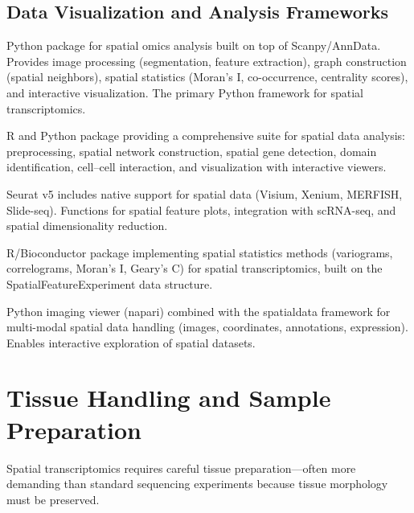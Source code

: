 \subsection{Data Visualization and Analysis Frameworks}

\begin{description}[style=nextline]
  \item[\software{Squidpy}] Python package for spatial omics analysis built on
    top of Scanpy/AnnData. Provides image processing (segmentation, feature
    extraction), graph construction (spatial neighbors), spatial statistics
    (Moran's I, co-occurrence, centrality scores), and interactive
    visualization. The primary Python framework for spatial transcriptomics.
  \item[\software{Giotto}] R and Python package providing a comprehensive suite
    for spatial data analysis: preprocessing, spatial network construction,
    spatial gene detection, domain identification, cell--cell interaction, and
    visualization with interactive viewers.
  \item[\software{Seurat} (spatial module)] Seurat v5 includes native support
    for spatial data (Visium, Xenium, MERFISH, Slide-seq). Functions for
    spatial feature plots, integration with scRNA-seq, and spatial
    dimensionality reduction.
  \item[\software{Voyager}] R/Bioconductor package implementing spatial
    statistics methods (variograms, correlograms, Moran's I, Geary's C) for
    spatial transcriptomics, built on the SpatialFeatureExperiment data
    structure.
  \item[\software{napari} + \software{spatialdata}] Python imaging viewer
    (napari) combined with the spatialdata framework for multi-modal spatial
    data handling (images, coordinates, annotations, expression). Enables
    interactive exploration of spatial datasets.
\end{description}


\section{Tissue Handling and Sample Preparation}
\label{sec:spatial:tissue}

Spatial transcriptomics requires careful tissue preparation---often more
demanding than standard sequencing experiments because tissue morphology must
be preserved.

